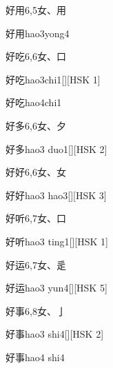 \begin{entry}{好用}{6,5}{⼥、⽤}
  \begin{phonetics}{好用}{hao3yong4}
  \end{phonetics}
\end{entry}

\begin{entry}{好吃}{6,6}{⼥、⼝}
  \begin{phonetics}{好吃}{hao3chi1}[][HSK 1]
  \end{phonetics}
  \begin{phonetics}{好吃}{hao4chi1}
  \end{phonetics}
\end{entry}

\begin{entry}{好多}{6,6}{⼥、⼣}
  \begin{phonetics}{好多}{hao3 duo1}[][HSK 2]
  \end{phonetics}
\end{entry}

\begin{entry}{好好}{6,6}{⼥、⼥}
  \begin{phonetics}{好好}{hao3 hao3}[][HSK 3]
  \end{phonetics}
\end{entry}

\begin{entry}{好听}{6,7}{⼥、⼝}
  \begin{phonetics}{好听}{hao3 ting1}[][HSK 1]
  \end{phonetics}
\end{entry}

\begin{entry}{好运}{6,7}{⼥、⾡}
  \begin{phonetics}{好运}{hao3 yun4}[][HSK 5]
  \end{phonetics}
\end{entry}

\begin{entry}{好事}{6,8}{⼥、⼅}
  \begin{phonetics}{好事}{hao3 shi4}[][HSK 2]
  \end{phonetics}
  \begin{phonetics}{好事}{hao4 shi4}
  \end{phonetics}
\end{entry}

